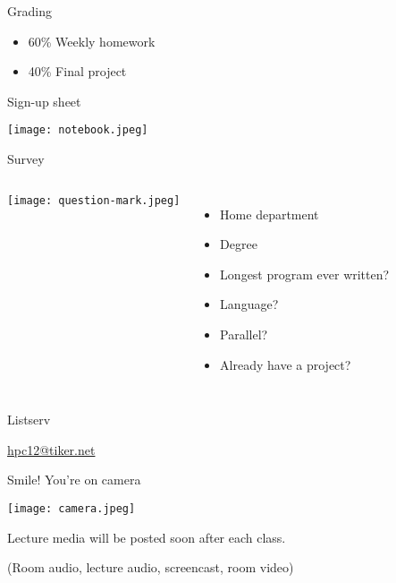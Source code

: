 \documentclass[english,compress]{beamer}
\begin{document}
\begin{frame}{Grading}
  \Large
  \begin{itemize}
    \item 60\% Weekly homework
    \item 40\% Final project
  \end{itemize}
\end{frame}
\begin{frame}{Sign-up sheet}
  \begin{center}
    \texttt{[image: notebook.jpeg]}
  \end{center}
\end{frame}
\begin{frame}{Survey}
  \begin{columns}
    \texttt{[image: question-mark.jpeg]}
    \begin{itemize}[<+->]
      \item Home department
      \item Degree
      \item Longest program ever written?
      \item Language?
      \item Parallel?
      \item Already have a project?
    \end{itemize}
  \end{columns}
\end{frame}
\begin{frame}{Listserv}
  \begin{center}
    \Huge
    \href{mailto:hpc12@tiker.net}{hpc12@tiker.net}
  \end{center}
\end{frame}
\begin{frame}{Smile! You're on camera}
  \begin{center}
    \texttt{[image: camera.jpeg]}

    Lecture media will be posted soon after each class.

    (Room audio, lecture audio, screencast, room video)
  \end{center}
\end{frame}
\end{document}
